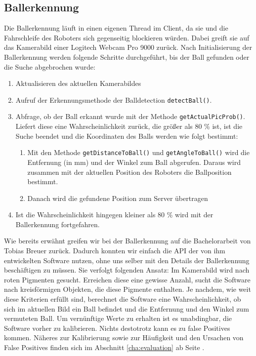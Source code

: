 \subsection{Ballerkennung}

\label{sec:balldetection}
Die Ballerkennung läuft in einen eigenen Thread im Client, da sie und
die Fahrschleife des Roboters sich gegenseitig blockieren
würden. Dabei greift sie auf das Kamerabild einer Logitech Webcam Pro 9000
zurück. Nach Initialisierung der Ballerkennung
werden folgende Schritte durchgeführt, bis der Ball gefunden oder die
Suche abgebrochen wurde:
\begin{enumerate}
\item Aktualisieren des aktuellen Kamerabildes
\item Aufruf der Erkennungsmethode der Balldetection
  \lstinline|detectBall()|. 
\item Abfrage, ob der Ball erkannt wurde mit der Methode
  \lstinline|getActualPicProb()|. Liefert diese eine
  Wahrscheinlichkeit zurück, die größer als 80 \% ist, ist die Suche
  beendet und die Koordinaten des Balls werden wie folgt bestimmt:
  \begin{enumerate}
  \item Mit den Methode \lstinline|getDistanceToBall()| und
    \lstinline|getAngleToBall()| wird die Entfernung (in mm) und der Winkel
    zum Ball abgerufen. Daraus wird zusammen mit der aktuellen Position des Roboters
    die Ballposition bestimmt.
  \item Danach wird die gefundene Position zum Server übertragen
  \end{enumerate}
\item Ist die Wahrscheinlichkeit hingegen kleiner als 80 \% wird mit
  der Ballerkennung fortgefahren. 
\end{enumerate}

Wie bereits erwähnt greifen wir bei der Ballerkennung auf die
Bachelorarbeit von Tobias Breuer zurück. Dadurch konnten wir einfach
die API der von ihm entwickelten Software nutzen, ohne uns selber mit
den Details der Ballerkennung beschäftigen zu müssen. Sie verfolgt
folgenden Ansatz: Im Kamerabild wird nach roten Pigmenten
gesucht. Erreichen diese eine gewisse Anzahl, sucht die Software nach
kreisförmigen Objekten, die diese Pigmente enthalten. Je nachdem,
wie weit diese Kriterien erfüllt sind, berechnet die Software eine
Wahrscheinlichkeit, ob sich im aktuellen Bild ein Ball befindet und
die Entfernung und den Winkel zum vermuteten Ball. Um vernünftige
Werte zu erhalten ist es unabdingbar, die Software vorher zu
kalibrieren. Nichts destotrotz kann es zu false Positives
kommen. Näheres zur Kalibrierung sowie zur Häufigkeit und den Ursachen von
False Positives finden sich im Abschnitt \ref{cha:evaluation} ab Seite \pageref{cha:evaluation}.
